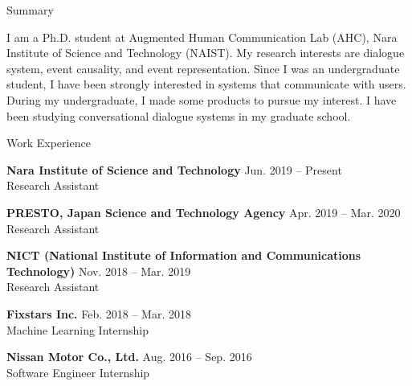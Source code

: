\documentclass{resume} %
\begin{document}

\begin{rSection}{Summary}

I am a Ph.D. student at Augmented Human Communication Lab (AHC), Nara Institute of Science and Technology (NAIST).
My research interests are dialogue system, event causality, and event representation.
Since I was an undergraduate student, I have been strongly interested in systems that communicate with users.
During my undergraduate, I made some products to pursue my interest.
I have been studying conversational dialogue systems in my graduate school.

\end{rSection}


\begin{rSection}{Work Experience}

{\bf Nara Institute of Science and Technology} \hfill {Jun. 2019 -- Present}
\\Research Assistant

{\bf PRESTO, Japan Science and Technology Agency} \hfill {Apr. 2019 -- Mar. 2020}
\\Research Assistant

{\bf NICT (National Institute of Information and Communications Technology)} \hfill {Nov. 2018 -- Mar. 2019}
\\Research Assistant

{\bf Fixstars Inc.} \hfill {Feb. 2018 -- Mar. 2018}
\\Machine Learning Internship

{\bf Nissan Motor Co., Ltd.} \hfill {Aug. 2016 -- Sep. 2016}
\\Software Engineer Internship

\end{rSection}

\end{document}
